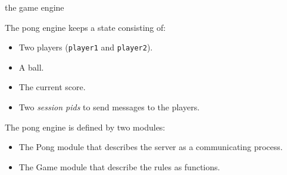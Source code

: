\begin{frame}{the game engine}

  The pong engine keeps a state consisting of:

  \vspace{10pt} \pause
  
  \begin{itemize}
  \item Two players ({\tt player1} and {\tt player2}). \pause
  \item A ball. \pause
  \item The current score.\pause
  \item Two {\em session pids} to send messages to the players. 
  \end{itemize}

  \vspace{10pt} \pause

  The pong engine is defined by two modules: 
  
  \vspace{10pt} \pause
  \begin{itemize}
  \item The Pong module that describes the server as a communicating process. 
  \item The Game module that describe the rules as functions. 
  \end{itemize}
  

\end{frame}


